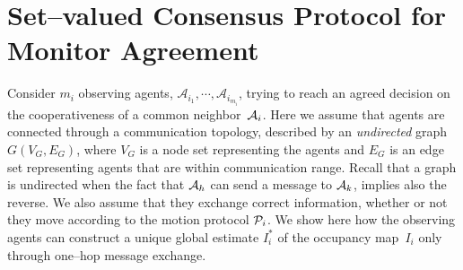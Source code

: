 \documentclass[journal, onecolumn, 12pt]{styles/IEEEtran}
\begin{document}

\section{Set--valued Consensus Protocol for Monitor Agreement}
\label{sec:consensus}

Consider $m_i$ observing agents, $\mathcal{A}_{i_1}, \cdots, \mathcal{A}_{i_{m_i}}$, trying to reach an agreed decision on the cooperativeness of a common neighbor~$\ai$. Here we assume that agents are connected through a communication topology, described by an {\em undirected} graph~$G(V_G, E_G)$, where $V_G$ is a node set representing the agents and $E_G$ is an edge set representing agents that are within communication range. Recall that a graph is undirected when the fact that $\ah$ can send a message to $\ak$, implies also the reverse. We also assume that they exchange correct information, whether or not they move according to the motion protocol $\P_i$. We show here how the observing agents can construct a unique global estimate $I_i^*$ of the occupancy map~$I_i$ only through one--hop message exchange.
\end{document}
